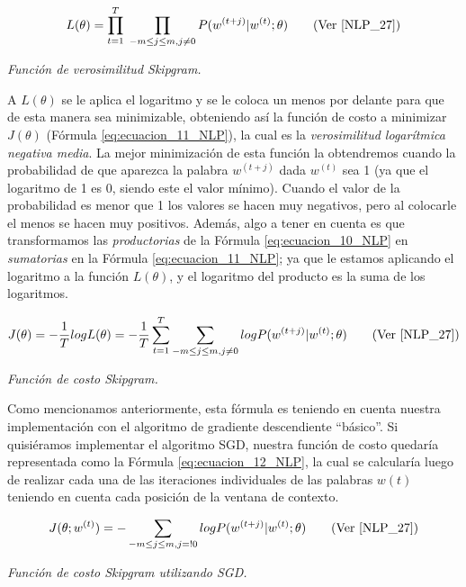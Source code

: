 \documentclass[12pt,a4paper]{article}
\begin{document}
\begin{sloppypar}
\begin{equation}\label{eq:ecuacion_10_NLP}
L(\theta) = \prod_{t=1}^{T} \; \prod_{-m \leq j \leq m, j \neq 0}  P(w^{(t+j)} | w^{(t)} ; \theta) \qquad \text{(Ver \cite{NLP_27})}
\end{equation} 
\begin{center}
\textit{Función de verosimilitud Skipgram.}
\end{center}

A  $L(\theta)$  se le aplica el logaritmo y se le coloca un menos por delante para que de esta manera sea minimizable, obteniendo así la función de costo a minimizar $J(\theta)$ (Fórmula \ref{eq:ecuacion_11_NLP}), la cual es la \textit{verosimilitud logarítmica negativa media}. La mejor minimización de esta función la obtendremos cuando la probabilidad de que aparezca la palabra $w^{(t+j)}$ dada $w^{(t)}$ sea 1 (ya que el logaritmo de 1 es 0, siendo este el valor mínimo). Cuando el valor de la probabilidad es menor que 1 los valores se hacen muy negativos, pero al colocarle el menos se hacen muy positivos. Además, algo a tener en cuenta es que transformamos las \textit{productorias} de la  Fórmula \ref{eq:ecuacion_10_NLP} en \textit{sumatorias} en la Fórmula \ref{eq:ecuacion_11_NLP}; ya que le estamos aplicando el logaritmo a la función $L(\theta)$, y el logaritmo del producto es la suma de los logaritmos.
\cleardoublepage

\begin{equation}\label{eq:ecuacion_11_NLP}
J(\theta) = -\frac{1}{T} log L (\theta) = -\frac{1}{T} \sum_{t=1}^{T} \sum_{-m \leq j \leq m, j \neq 0} log P(w^{(t+j)} | w^{(t)} ; \theta)    \qquad \text{(Ver \cite{NLP_27})}
\end{equation}
\begin{center}
\textit{Función de costo Skipgram.}
\end{center}

Como mencionamos anteriormente, esta fórmula es teniendo en cuenta nuestra implementación con el algoritmo de gradiente descendiente “básico”. Si quisiéramos implementar el algoritmo SGD, nuestra función de costo quedaría representada como la Fórmula \ref{eq:ecuacion_12_NLP}, la cual se calcularía luego de realizar cada una de las iteraciones individuales de las palabras $w(t)$ teniendo en cuenta  cada posición de la ventana de contexto. 

\begin{equation}\label{eq:ecuacion_12_NLP}
J (\theta;w^{(t)}) = - \sum_{-m \leq j \leq m, j =! 0} log P(w^{(t+j)} | w^{(t)} ; \theta)   \qquad \text{(Ver \cite{NLP_27})}
\end{equation}
\begin{center}
\textit{Función de costo Skipgram utilizando SGD.}
\end{center}


\end{sloppypar}
\end{document}
